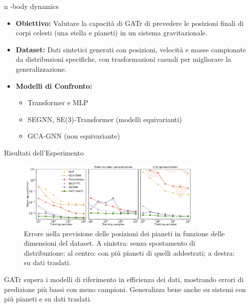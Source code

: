 \begin{frame}{n -body dynamics}
    \begin{itemize}
        \item \textbf{Obiettivo:} Valutare la capacità di GATr di prevedere le posizioni finali di 
        corpi celesti (una stella e pianeti) in un sistema gravitazionale.
        \item \textbf{Dataset:} Dati sintetici generati con posizioni, velocità e masse campionate da 
        distribuzioni specifiche, con trasformazioni casuali per migliorare la generalizzazione.
        \item \textbf{Modelli di Confronto:}
        \begin{itemize}
            \item Transformer e MLP
            \item SEGNN, SE(3)-Transformer (modelli equivarianti)
            \item GCA-GNN (non equivariante)
        \end{itemize}
    \end{itemize}
    
\end{frame}

\begin{frame}{Risultati dell'Esperimento}
    \begin{figure}
        \centering
        \includegraphics[width=0.8\textwidth]{../Images/n-body.png}
        \caption{Errore nella previsione delle posizioni dei pianeti in funzione delle 
        dimensioni del dataset. A sinistra: senza spostamento di distribuzione; al centro: 
        con più pianeti di quelli addestrati; a destra: su dati traslati.}
    \end{figure}

    GATr supera i modelli di riferimento in efficienza dei dati, mostrando errori di 
    predizione più bassi con meno campioni. Generalizza bene anche su sistemi con più 
    pianeti e su dati traslati.
\end{frame}

